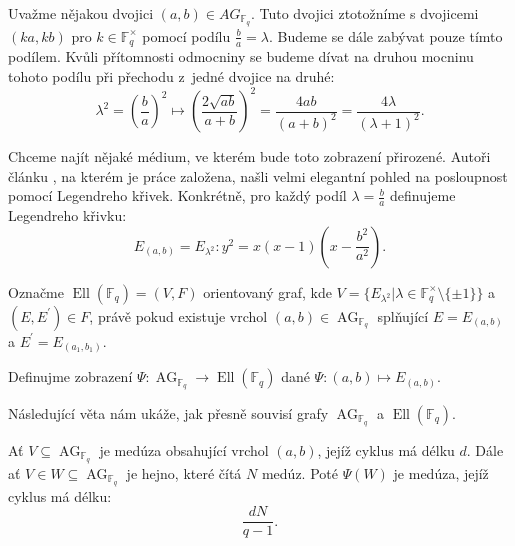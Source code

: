 \documentclass[12pt]{report}
\DeclareMathOperator{\Ell}{Ell}
\DeclareMathOperator{\AG}{AG}
\begin{document}
Uvažme nějakou dvojici $(a,b) \in AG_{\mathbb{F}_q}$. Tuto dvojici ztotožníme s dvojicemi $(ka,kb)$ pro $k \in \mathbb{F}_q ^{\times}$ pomocí podílu $\frac{b}{a} = \lambda$. Budeme se dále zabývat pouze tímto podílem. Kvůli přítomnosti odmocniny se budeme dívat na druhou mocninu tohoto podílu při přechodu z~jedné dvojice na druhé:
$$\lambda^2 =\left(\frac{b}{a}\right)^2 \longmapsto \left(\frac{2 \sqrt{ab}}{a+b}\right)^2 = \frac{4ab}{(a+b)^2} = \frac{4 \lambda}{(\lambda+1)^2}.$$

Chceme najít nějaké médium, ve kterém bude toto zobrazení přirozené. Autoři článku \cite{Meduza}, na kterém je práce založena, našli velmi elegantní pohled na posloupnost pomocí Legendreho křivek. Konkrétně, pro každý podíl $\lambda = \frac{b}{a}$ definujeme Legendreho křivku:
$$E_{(a,b)} = E_{\lambda ^2} : y^2 = x(x-1)\left(x - \frac{b^2}{a^2} \right).$$


\begin{definice}
Označme $\Ell(\mathbb{F}_q) = (V,F)$ orientovaný graf, kde $V = \lbrace E_{\lambda^2} \vert \lambda \in \mathbb{F}_q ^{\times} \setminus \lbrace \pm 1 \rbrace \rbrace$ a $(E,E^\prime) \in F$, právě pokud existuje vrchol $(a,b) \in \AG_{\mathbb{F}_q}$ splňující $E = E_{(a,b)}$ a $E^\prime = E_{(a_1,b_1)}$.
\end{definice}
\begin{definice}
Definujme zobrazení $\Psi : \AG_{\mathbb{F}_q} \longrightarrow \Ell(\mathbb{F}_q) $ dané $\Psi : (a,b) \longmapsto E_{(a,b)}$.
\end{definice}
Následující věta nám ukáže, jak přesně souvisí grafy $\AG_{\mathbb{F}_q}$ a $\Ell(\mathbb{F}_q)$.
\begin{veta}\label{lol}
Ať $V \subseteq \AG_{\mathbb{F}_q}$ je medúza obsahující vrchol $(a,b)$, jejíž cyklus má délku $d$. Dále ať $V \in W \subseteq \AG_{\mathbb{F}_q}$ je hejno, které čítá $N$ medúz. Poté $\Psi(W)$ je medúza, jejíž cyklus má délku:
$$\frac{d N}{q-1}.$$
\end{veta}
\end{document}
